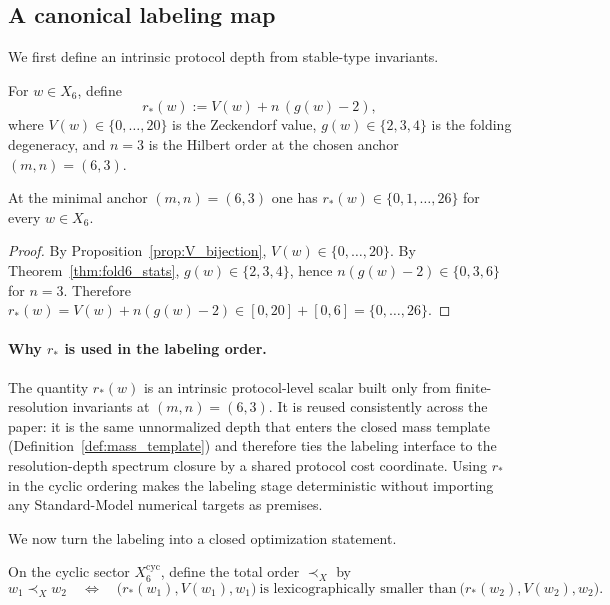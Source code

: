 \subsection{A canonical labeling map}
\label{subsec:sm_labeling_map}

We first define an intrinsic protocol depth from stable-type invariants.
\begin{definition}[Effective protocol depth at $(m,n)=(6,3)$]\label{def:r_star}
For $w\in X_6$, define
\begin{equation}\label{eq:r_star_def}
r_\ast(w):=V(w)+n\,(g(w)-2),
\end{equation}
where $V(w)\in\{0,\dots,20\}$ is the Zeckendorf value, $g(w)\in\{2,3,4\}$ is the folding degeneracy, and $n=3$ is the Hilbert order at the chosen anchor $(m,n)=(6,3)$.
\end{definition}

\begin{lemma}[Discrete range of $r_\ast$ at $(m,n)=(6,3)$]\label{lem:rstar_range}
At the minimal anchor $(m,n)=(6,3)$ one has $r_\ast(w)\in\{0,1,\dots,26\}$ for every $w\in X_6$.
\end{lemma}
\begin{proof}
By Proposition~\ref{prop:V_bijection}, $V(w)\in\{0,\dots,20\}$.
By Theorem~\ref{thm:fold6_stats}, $g(w)\in\{2,3,4\}$, hence $n(g(w)-2)\in\{0,3,6\}$ for $n=3$.
Therefore $r_\ast(w)=V(w)+n(g(w)-2)\in[0,20]+[0,6]=\{0,\dots,26\}$.
\end{proof}

\paragraph{Why \texorpdfstring{$r_\ast$}{r*} is used in the labeling order.}
The quantity $r_\ast(w)$ is an intrinsic protocol-level scalar built only from finite-resolution invariants at $(m,n)=(6,3)$.
It is reused consistently across the paper: it is the same unnormalized depth that enters the closed mass template (Definition~\ref{def:mass_template}) and therefore ties the labeling interface to the resolution-depth spectrum closure by a shared protocol cost coordinate.
Using $r_\ast$ in the cyclic ordering makes the labeling stage deterministic without importing any Standard-Model numerical targets as premises.

We now turn the labeling into a closed optimization statement.

\begin{definition}\label{def:order_x6}
On the cyclic sector $X_6^{\mathrm{cyc}}$, define the total order $\prec_X$ by
\[
w_1\prec_X w_2
\quad\Longleftrightarrow\quad
\bigl(r_\ast(w_1),V(w_1),w_1\bigr)\ \text{is lexicographically smaller than}\ \bigl(r_\ast(w_2),V(w_2),w_2\bigr).
\]
\end{definition}

